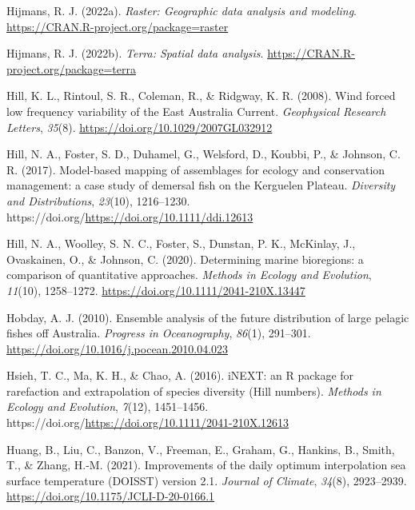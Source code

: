 \documentclass{article}
\newlength{\cslhangindent}
\newlength{\cslentryspacingunit} %
\newenvironment{CSLReferences}[2] %
 {%
  \setlength{\parindent}{0pt}
  \ifodd #1
  \let\oldpar\par
  \def\par{\hangindent=\cslhangindent\oldpar}
  \fi
  \setlength{\parskip}{#2\cslentryspacingunit}
 }%
 {}
\begin{document}
\begin{linenumbers}
\begin{CSLReferences}{1}{0}
\leavevmode{}%
Hijmans, R. J. (2022a). \emph{Raster: Geographic data analysis and modeling}. \url{https://CRAN.R-project.org/package=raster}

\leavevmode{}%
Hijmans, R. J. (2022b). \emph{Terra: Spatial data analysis}. \url{https://CRAN.R-project.org/package=terra}

\leavevmode{}%
Hill, K. L., Rintoul, S. R., Coleman, R., \& Ridgway, K. R. (2008). Wind forced low frequency variability of the East Australia Current. \emph{Geophysical Research Letters}, \emph{35}(8). \url{https://doi.org/10.1029/2007GL032912}

\leavevmode{}%
Hill, N. A., Foster, S. D., Duhamel, G., Welsford, D., Koubbi, P., \& Johnson, C. R. (2017). Model-based mapping of assemblages for ecology and conservation management: a case study of demersal fish on the Kerguelen Plateau. \emph{Diversity and Distributions}, \emph{23}(10), 1216--1230. https://doi.org/\url{https://doi.org/10.1111/ddi.12613}

\leavevmode{}%
Hill, N. A., Woolley, S. N. C., Foster, S., Dunstan, P. K., McKinlay, J., Ovaskainen, O., \& Johnson, C. (2020). Determining marine bioregions: a comparison of quantitative approaches. \emph{Methods in Ecology and Evolution}, \emph{11}(10), 1258--1272. \url{https://doi.org/10.1111/2041-210X.13447}

\leavevmode{}%
Hobday, A. J. (2010). Ensemble analysis of the future distribution of large pelagic fishes off Australia. \emph{Progress in Oceanography}, \emph{86}(1), 291--301. \url{https://doi.org/10.1016/j.pocean.2010.04.023}

\leavevmode{}%
Hsieh, T. C., Ma, K. H., \& Chao, A. (2016). iNEXT: an R package for rarefaction and extrapolation of species diversity (Hill numbers). \emph{Methods in Ecology and Evolution}, \emph{7}(12), 1451--1456. https://doi.org/\url{https://doi.org/10.1111/2041-210X.12613}

\leavevmode{}%
Huang, B., Liu, C., Banzon, V., Freeman, E., Graham, G., Hankins, B., Smith, T., \& Zhang, H.-M. (2021). Improvements of the daily optimum interpolation sea surface temperature (DOISST) version 2.1. \emph{Journal of Climate}, \emph{34}(8), 2923--2939. \url{https://doi.org/10.1175/JCLI-D-20-0166.1}


\end{CSLReferences}
\end{linenumbers}
\end{document}
